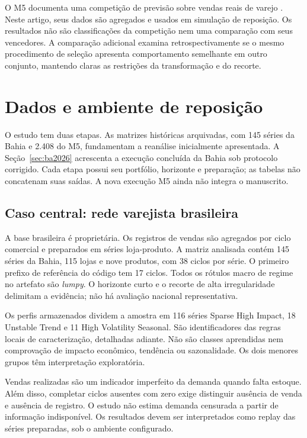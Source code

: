 \documentclass[preprint,12pt]{elsarticle}
\begin{document}
O M5 documenta uma competição de previsão sobre vendas reais de varejo \cite{Makridakis2022M5Accuracy}. Neste artigo, seus dados são agregados e usados em simulação de reposição. Os resultados não são classificações da competição nem uma comparação com seus vencedores. A comparação adicional examina retrospectivamente se o mesmo procedimento de seleção apresenta comportamento semelhante em outro conjunto, mantendo claras as restrições da transformação e do recorte.

\section{Dados e ambiente de reposição}
O estudo tem duas etapas. As matrizes históricas arquivadas, com 145 séries da Bahia e 2.408 do M5, fundamentam a reanálise inicialmente apresentada. A Seção~\ref{sec:ba2026} acrescenta a execução concluída da Bahia sob protocolo corrigido. Cada etapa possui seu portfólio, horizonte e preparação; as tabelas não concatenam suas saídas. A nova execução M5 ainda não integra o manuscrito.
\subsection{Caso central: rede varejista brasileira}
A base brasileira é proprietária. Os registros de vendas são agregados por ciclo comercial e preparados em séries loja-produto. A matriz analisada contém 145 séries da Bahia, 115 lojas e nove produtos, com 38 ciclos por série. O primeiro prefixo de referência do código tem 17 ciclos. Todos os rótulos macro de regime no artefato são \textit{lumpy}. O horizonte curto e o recorte de alta irregularidade delimitam a evidência; não há avaliação nacional representativa.

Os perfis armazenados dividem a amostra em 116 séries Sparse High Impact, 18 Unstable Trend e 11 High Volatility Seasonal. São identificadores das regras locais de caracterização, detalhadas adiante. Não são classes aprendidas nem comprovação de impacto econômico, tendência ou sazonalidade. Os dois menores grupos têm interpretação exploratória.

Vendas realizadas são um indicador imperfeito da demanda quando falta estoque. Além disso, completar ciclos ausentes com zero exige distinguir ausência de venda e ausência de registro. O estudo não estima demanda censurada a partir de informação indisponível. Os resultados devem ser interpretados como replay das séries preparadas, sob o ambiente configurado.
\end{document}
